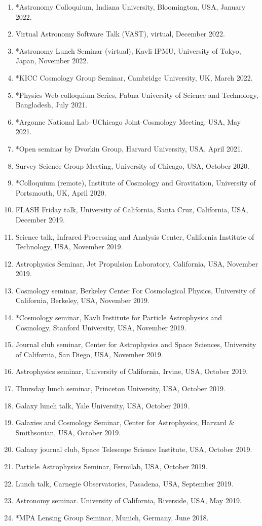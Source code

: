 \documentclass[margin, line]{res}
\begin{document}
\begin{resume}
\begin{enumerate}
	\item {*}Astronomy Colloquium, Indiana University, Bloomington, USA, January 2022.
	\item Virtual Astronomy Software Talk (VAST), virtual, December 2022.
	\item {*}Astronomy Lunch Seminar (virtual), Kavli IPMU, University of Tokyo, Japan, November 2022.
	\item {*}KICC Cosmology Group Seminar, Cambridge University, UK, March 2022.
	\item {*}Physics Web-colloquium Series, Pabna University of Science and Technology, Bangladesh, July 2021.
	\item {*}Argonne National Lab--UChicago Joint Cosmology Meeting, USA, May 2021.
	\item {*}Open seminar by Dvorkin Group, Harvard University, USA, April 2021.
	\item Survey Science Group Meeting, University of Chicago, USA, October 2020.
	\item {*}Colloquium (remote), Institute of Cosmology and Gravitation, University of Portsmouth, UK, April 2020.
	\item FLASH Friday talk, University of California, Santa Cruz, California, USA, December 2019.
	\item Science talk, Infrared Processing and Analysis Center, California Institute of Technology, USA, November 2019.
	\item Astrophysics Seminar, Jet Propulsion Laboratory, California, USA, November 2019.
	\item Cosmology seminar, Berkeley Center For Cosmological Physics, University of California, Berkeley, USA, November 2019. 
	\item *Cosmology seminar, Kavli Institute for Particle Astrophysics and Cosmology, Stanford University, USA, November 2019.
	\item Journal club seminar, Center for Astrophysics and Space Sciences, University of California, San Diego, USA, November 2019.
	\item Astrophysics seminar, University of California, Irvine, USA, October 2019.
	\item Thursday lunch seminar, Princeton University, USA, October 2019.
	\item Galaxy lunch talk, Yale University, USA, October 2019.
	\item Galaxies and Cosmology Seminar, Center for Astrophysics, Harvard \& Smithsonian, USA, October 2019.
	\item Galaxy journal club, Space Telescope Science Institute, USA, October 2019.
	\item Particle Astrophysics Seminar, Fermilab, USA, October 2019.
	\item Lunch talk, Carnegie Observatories, Pasadena, USA, September 2019.
	\item Astronomy seminar. University of California, Riverside, USA, May 2019. 
	\item {*}MPA Lensing Group Seminar, Munich, Germany, June 2018.
\end{enumerate}



\end{resume}
\end{document}

